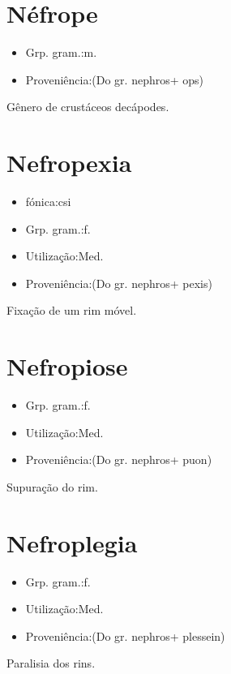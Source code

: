 \section{Néfrope}
\begin{itemize}
\item {Grp. gram.:m.}
\end{itemize}
\begin{itemize}
\item {Proveniência:(Do gr. \textunderscore nephros\textunderscore  + \textunderscore ops\textunderscore )}
\end{itemize}
Gênero de crustáceos decápodes.
\section{Nefropexia}
\begin{itemize}
\item {fónica:csi}
\end{itemize}
\begin{itemize}
\item {Grp. gram.:f.}
\end{itemize}
\begin{itemize}
\item {Utilização:Med.}
\end{itemize}
\begin{itemize}
\item {Proveniência:(Do gr. \textunderscore nephros\textunderscore  + \textunderscore pexis\textunderscore )}
\end{itemize}
Fixação de um rim móvel.
\section{Nefropiose}
\begin{itemize}
\item {Grp. gram.:f.}
\end{itemize}
\begin{itemize}
\item {Utilização:Med.}
\end{itemize}
\begin{itemize}
\item {Proveniência:(Do gr. \textunderscore nephros\textunderscore  + \textunderscore puon\textunderscore )}
\end{itemize}
Supuração do rim.
\section{Nefroplegia}
\begin{itemize}
\item {Grp. gram.:f.}
\end{itemize}
\begin{itemize}
\item {Utilização:Med.}
\end{itemize}
\begin{itemize}
\item {Proveniência:(Do gr. \textunderscore nephros\textunderscore  + \textunderscore plessein\textunderscore )}
\end{itemize}
Paralisia dos rins.
